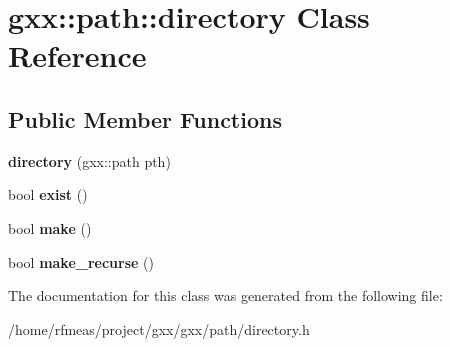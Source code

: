 \hypertarget{classgxx_1_1path_1_1directory}{}\section{gxx\+:\+:path\+:\+:directory Class Reference}
\label{classgxx_1_1path_1_1directory}
\subsection*{Public Member Functions}
\begin{DoxyCompactItemize}
\item 
{\bfseries directory} (gxx\+::path pth)\hypertarget{classgxx_1_1path_1_1directory_aaabf4de76bdb600822314f86f1d93831}{}\label{classgxx_1_1path_1_1directory_aaabf4de76bdb600822314f86f1d93831}

\item 
bool {\bfseries exist} ()\hypertarget{classgxx_1_1path_1_1directory_a328c2d048fe528298dcb390ac0b8281d}{}\label{classgxx_1_1path_1_1directory_a328c2d048fe528298dcb390ac0b8281d}

\item 
bool {\bfseries make} ()\hypertarget{classgxx_1_1path_1_1directory_a263c2d67881dea992c915d223ab9c856}{}\label{classgxx_1_1path_1_1directory_a263c2d67881dea992c915d223ab9c856}

\item 
bool {\bfseries make\+\_\+recurse} ()\hypertarget{classgxx_1_1path_1_1directory_a6f3450d67583019ac3e382ebe3b050ad}{}\label{classgxx_1_1path_1_1directory_a6f3450d67583019ac3e382ebe3b050ad}

\end{DoxyCompactItemize}


The documentation for this class was generated from the following file\+:\begin{DoxyCompactItemize}
\item 
/home/rfmeas/project/gxx/gxx/path/directory.\+h\end{DoxyCompactItemize}
